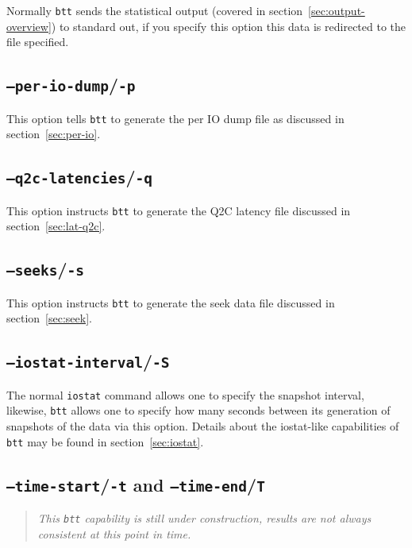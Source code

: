 \documentclass{article}
\begin{document}
  Normally \texttt{btt} sends the statistical output (covered in
  section~\ref{sec:output-overview}) to standard out, if you specify
  this option this data is redirected to the file specified.

\subsection{\label{sec:o-p}\texttt{--per-io-dump}/\texttt{-p}}

  This option tells \texttt{btt} to generate the per IO dump file as
  discussed in section~\ref{sec:per-io}.

\subsection{\label{sec:o-q}\texttt{--q2c-latencies}/\texttt{-q}}

  This option instructs \texttt{btt} to generate the Q2C latency file
  discussed in section~\ref{sec:lat-q2c}.

\subsection{\label{sec:o-s}\texttt{--seeks}/\texttt{-s}}

  This option instructs \texttt{btt} to generate the seek data file
  discussed in section~\ref{sec:seek}.

\subsection{\label{sec:o-S}\texttt{--iostat-interval}/\texttt{-S}}

  The normal \texttt{iostat} command allows one to specify the snapshot
  interval, likewise, \texttt{btt} allows one to specify how many seconds
  between its generation of snapshots of the data via this option. Details
  about the iostat-like capabilities of \texttt{btt} may be found in
  section~\ref{sec:iostat}.

\subsection{\label{sec:o-tT}\texttt{--time-start}/\texttt{-t} and
\texttt{--time-end}/\texttt{T}}

  \begin{quote}
    \emph{This \texttt{btt} capability is still under construction, results are
    not always consistent at this point in time.}
  \end{quote}
\end{document}
